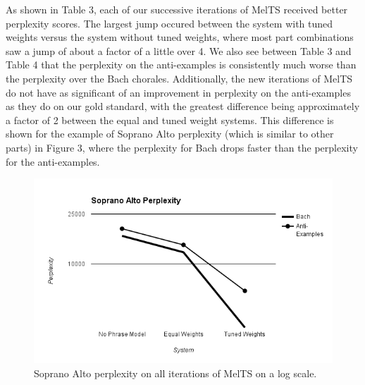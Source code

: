 \documentclass{sig-alternate}
\begin{document}
As shown in Table 3, each of our successive iterations of MelTS received better perplexity scores. The largest jump occured between the system with tuned
weights versus the system without tuned weights, where most part combinations saw a jump of about a factor of a little over 4. We also see between Table 3 and Table 4 that the perplexity on the anti-examples is consistently much worse than the perplexity over the Bach chorales. Additionally, the new iterations of MelTS do not have as significant of an improvement in perplexity on the anti-examples as they do on our gold standard, with the greatest difference being approximately a factor of 2 between the equal and tuned weight systems. This difference is shown for the example of Soprano Alto perplexity (which is similar to other parts) in Figure 3, where the perplexity for Bach drops faster than the perplexity for the anti-examples.

\begin{figure}
  \includegraphics[scale=0.5]{soprano_alto_perplexity}
  \caption{Soprano Alto perplexity on all iterations of MelTS on a log scale.}
\end{figure}
\end{document}
